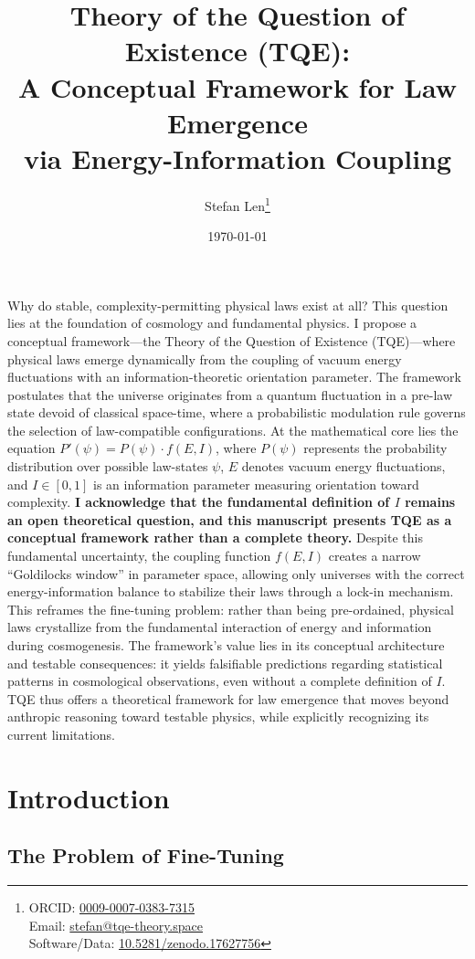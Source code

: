 \documentclass[12pt,a4paper]{article}
\title{Theory of the Question of Existence (TQE):\\ A Conceptual Framework for Law Emergence\\ via Energy-Information Coupling}
\author{Stefan Len\footnote{ORCID: \href{https://orcid.org/0009-0007-0383-7315}{0009-0007-0383-7315} \\
Email: \href{mailto:stefan@tqe-theory.space}{stefan@tqe-theory.space} \\
Software/Data: \href{https://doi.org/10.5281/zenodo.17627756}{10.5281/zenodo.17627756}}}
\date{\today}
\theoremstyle{definition}
\theoremstyle{remark}
\renewenvironment{abstract}{%
  \small
  \begin{center}%
    {\bfseries \abstractname\vspace{-.5em}\vspace{0pt}}%
  \end{center}%
  \list{}{%
    \setlength{\leftmargin}{0pt}%
    \setlength{\rightmargin}{0pt}%
    \setlength{\listparindent}{0pt}%
    \setlength{\itemindent}{0pt}%
    \setlength{\parsep}{0pt}%
    \setlength{\topsep}{0pt}%
  }%
  \item\relax
}{%
  \endlist
}
\begin{document}
\maketitle

\begin{abstract}
Why do stable, complexity-permitting physical laws exist at all? This question lies at the foundation of cosmology and fundamental physics. I propose a conceptual framework—the Theory of the Question of Existence (TQE)—where physical laws emerge dynamically from the coupling of vacuum energy fluctuations with an information-theoretic orientation parameter. The framework postulates that the universe originates from a quantum fluctuation in a pre-law state devoid of classical space-time, where a probabilistic modulation rule governs the selection of law-compatible configurations. At the mathematical core lies the equation $P'(\psi) = P(\psi) \cdot f(E,I)$, where $P(\psi)$ represents the probability distribution over possible law-states $\psi$, $E$ denotes vacuum energy fluctuations, and $I \in [0,1]$ is an information parameter measuring orientation toward complexity. \textbf{I acknowledge that the fundamental definition of $I$ remains an open theoretical question, and this manuscript presents TQE as a conceptual framework rather than a complete theory.} Despite this fundamental uncertainty, the coupling function $f(E,I)$ creates a narrow ``Goldilocks window'' in parameter space, allowing only universes with the correct energy-information balance to stabilize their laws through a lock-in mechanism. This reframes the fine-tuning problem: rather than being pre-ordained, physical laws crystallize from the fundamental interaction of energy and information during cosmogenesis. The framework's value lies in its conceptual architecture and testable consequences: it yields falsifiable predictions regarding statistical patterns in cosmological observations, even without a complete definition of $I$. TQE thus offers a theoretical framework for law emergence that moves beyond anthropic reasoning toward testable physics, while explicitly recognizing its current limitations.
\end{abstract}

\section{Introduction}

\subsection{The Problem of Fine-Tuning}
\end{document}
